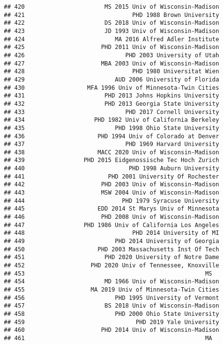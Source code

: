 \documentclass[
]{article}
\begin{document}
\begin{verbatim}
## 420                       MS 2015 Univ of Wisconsin-Madison
## 421                               PHD 1988 Brown University
## 422                       DS 2018 Univ of Wisconsin-Madison
## 423                       JD 1993 Univ of Wisconsin-Madison
## 424                          MA 2016 Alfred Adler Institute
## 425                      PHD 2011 Univ of Wisconsin-Madison
## 426                             PHD 2003 University of Utah
## 427                      MBA 2003 Univ of Wisconsin-Madison
## 428                               PHD 1980 Universitat Wien
## 429                          AUD 2006 University of Florida
## 430                  MFA 1996 Univ of Minnesota-Twin Cities
## 431                       PHD 2013 Johns Hopkins University
## 432                       PHD 2013 Georgia State University
## 433                             PHD 2017 Cornell University
## 434                    PHD 1982 Univ of California Berkeley
## 435                          PHD 1998 Ohio State University
## 436                     PHD 1994 Univ of Colorado at Denver
## 437                             PHD 1969 Harvard University
## 438                     MACC 2020 Univ of Wisconsin-Madison
## 439                 PHD 2015 Eidgenossische Tec Hoch Zurich
## 440                              PHD 1998 Auburn University
## 441                        PHD 2001 University Of Rochester
## 442                      PHD 2003 Univ of Wisconsin-Madison
## 443                      MSW 2004 Univ of Wisconsin-Madison
## 444                            PHD 1979 Syracuse University
## 445                     EDD 2014 St Marys Univ of Minnesota
## 446                      PHD 2008 Univ of Wisconsin-Madison
## 447                 PHD 1986 Univ of California Los Angeles
## 448                               PHD 2014 University of MI
## 449                          PHD 2014 University of Georgia
## 450                     PHD 2003 Massachusetts Inst Of Tech
## 451                       PHD 2020 University of Notre Dame
## 452                   PHD 2020 Univ of Tennessee, Knoxville
## 453                                                    MS  
## 454                       MD 1966 Univ of Wisconsin-Madison
## 455                   MA 2019 Univ of Minnesota-Twin Cities
## 456                          PHD 1995 University of Vermont
## 457                       BS 2018 Univ of Wisconsin-Madison
## 458                          PHD 2000 Ohio State University
## 459                                PHD 2019 Yale University
## 460                      PHD 2014 Univ of Wisconsin-Madison
## 461                                                    MA  

\end{verbatim}
\end{document}
